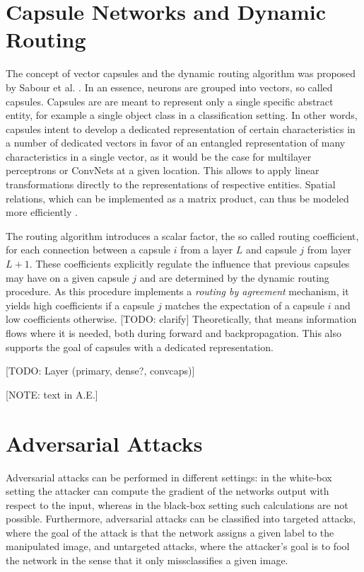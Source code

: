 \documentclass{article}
\begin{document}
\section{Capsule Networks and Dynamic Routing}
\label{lab:capsules}
The concept of vector capsules and the dynamic routing algorithm was proposed by Sabour et al. . In an essence, neurons are grouped into vectors, so called capsules. Capsules are are meant to represent only a single specific abstract entity, for example a single object class in a classification setting.
In other words, capsules intent to develop a dedicated representation of certain characteristics in a number of dedicated vectors in favor of an entangled representation of many characteristics in a single vector, as it would be the case for multilayer perceptrons or ConvNets at a given location. This allows to apply linear transformations directly to the representations of respective entities. Spatial relations, which can be implemented as a matrix product, can thus be modeled more efficiently \cite{capsules}.

The routing algorithm introduces a scalar factor, the so called routing coefficient, for each connection between a capsule $i$ from a layer $L$ and capsule $j$ from layer $L+1$. These coefficients explicitly regulate the influence that previous capsules may have on a given capsule $j$ and are determined by the dynamic routing procedure. As this procedure implements a \textit{routing by agreement} mechanism, it yields high coefficients if a capsule $j$ matches the expectation of a capsule $i$ and low coefficients otherwise. [TODO: clarify] Theoretically, that means information flows where it is needed, both during forward and backpropagation. This also supports the goal of capsules with a dedicated representation.

[TODO: Layer (primary, dense?, convcaps)]

[NOTE: text in A.E.]



\section{Adversarial Attacks}
\label{lab:attacks}

Adversarial attacks can be performed in different settings: in the white-box setting the attacker can compute the gradient of the networks output with respect to the input, whereas in the black-box setting such calculations are not possible. Furthermore, adversarial attacks can be classified into targeted attacks, where the goal of the attack is that the network assigns a given label to the manipulated image, and untargeted attacks, where the attacker's goal is to fool the network in the sense that it only missclassifies a given image.
\end{document}
